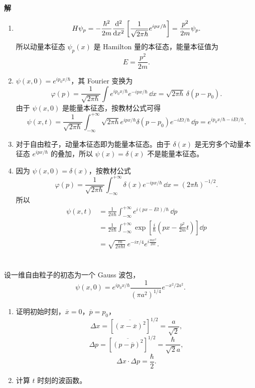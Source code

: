 \documentclass[12pt,a4paper]{article}
\begin{document}
\noindent\textbf{解}
\begin{enumerate}[label=(\alph*)]
  \item
  \[
  H\psi_p = -\frac{\hbar^2}{2m}\dv[2]{}{x}\left[\frac{1}{\sqrt{2\pi\hbar}}e^{ipx/\hbar}\right]
  = \frac{p^2}{2m}\psi_p.
  \]
  所以动量本征态 $\psi_p(x)$ 是 Hamilton 量的本征态，能量本征值为
  \[
  E = \frac{p^2}{2m}.
  \]

  \item $\psi(x,0)=e^{ip_0x/\hbar}$，其 Fourier 变换为
  \[
  \varphi(p)=\frac{1}{\sqrt{2\pi\hbar}}\int e^{ip_0x/\hbar}e^{-ipx/\hbar}\, \dd x
  = \sqrt{2\pi\hbar}\,\delta(p-p_0).
  \]
  由于 $\psi(x,0)$ 是能量本征态，按教材公式可得
  \[
  \psi(x,t)=\frac{1}{\sqrt{2\pi\hbar}}\int_{-\infty}^{+\infty}\sqrt{2\pi\hbar}
  e^{ipx/\hbar}\delta(p-p_0)e^{-iEt/\hbar}\, \dd p
  = e^{ip_0x/\hbar - iEt/\hbar}.
  \]

  \item 对于自由粒子，动量本征态即为能量本征态。由于 $\delta(x)$ 是无穷多个动量本征态 $e^{ipx/\hbar}$ 的叠加，所以 $\psi(x)=\delta(x)$ 不是能量本征态。

  \item 因为 $\psi(x,0)=\delta(x)$，按教材公式
  \[
  \varphi(p)=\frac{1}{\sqrt{2\pi\hbar}}\int_{-\infty}^{+\infty}\delta(x)e^{-ipx/\hbar}\, \dd x=(2\pi\hbar)^{-1/2}.
  \]
  所以
  \begin{align*}
  \psi(x,t)&=\frac{1}{2\pi\hbar}\int_{-\infty}^{+\infty}e^{i(px-Et)/\hbar}\, \dd p\\
  &= \frac{1}{2\pi\hbar}\int_{-\infty}^{+\infty}\exp\left[\frac{i}{\hbar}\left(px-\frac{p^2}{2m}t\right)\right]\dd p\\
  &= \sqrt{\frac{m}{2\pi\hbar t}}\, e^{-i\pi/4} e^{i\frac{mx^2}{2\hbar t}}.
  \end{align*}  
\end{enumerate}

\section{}
设一维自由粒子的初态为一个 Gauss 波包，
\[
\psi(x,0)=e^{ip_0x/\hbar}\frac{1}{(\pi a^2)^{1/4}}e^{-x^2/2a^2}.
\]

\begin{enumerate}[label=(\arabic*)]
    \item 证明初始时刻，$\overline x = 0$，$\overline p = p_0$，
      \[
      \Delta x = \left[\overline{(x-\overline x)^2}\right]^{1/2}=\frac{a}{\sqrt{2}},
      \]
      \[
      \Delta p = \left[\overline{(p-\overline p)^2}\right]^{1/2}=\frac{\hbar}{\sqrt{2}a},
      \]
      \[
      \Delta x\cdot \Delta p = \frac{\hbar}{2}.
      \]
    \item 计算 $t$ 时刻的波函数。
\end{enumerate}
\end{document}
